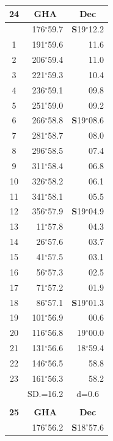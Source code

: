 \documentclass[10pt, a4paper]{report}
\begin{document}
\begin{scriptsize}
\begin{tabular*}{0.2\textwidth}[t]{@{\extracolsep{\fill}}|c|rr|}
\hline
\multicolumn{1}{|c|}{\rule{0pt}{2.6ex}\textbf{24}} & \multicolumn{1}{c}{\textbf{GHA}} & \multicolumn{1}{c|}{\textbf{Dec}}\\
\hline\rule{0pt}{2.6ex}\noindent
0 & 176$^\circ$59.7 & \textbf{S}19$^\circ$12.2\\
1 & 191$^\circ$59.6 & 11.6\\
2 & 206$^\circ$59.4 & 11.0\\
3 & 221$^\circ$59.3 & \raisebox{0.24ex}{\boldmath$\cdot$~\boldmath$\cdot$~~}10.4\\
4 & 236$^\circ$59.1 & 09.8\\
5 & 251$^\circ$59.0 & 09.2\\[2Pt]
6 & 266$^\circ$58.8 & \textbf{S}19$^\circ$08.6\\
7 & 281$^\circ$58.7 & 08.0\\
8 & 296$^\circ$58.5 & 07.4\\
9 & 311$^\circ$58.4 & \raisebox{0.24ex}{\boldmath$\cdot$~\boldmath$\cdot$~~}06.8\\
10 & 326$^\circ$58.2 & 06.1\\
11 & 341$^\circ$58.1 & 05.5\\[2Pt]
12 & 356$^\circ$57.9 & \textbf{S}19$^\circ$04.9\\
13 & 11$^\circ$57.8 & 04.3\\
14 & 26$^\circ$57.6 & 03.7\\
15 & 41$^\circ$57.5 & \raisebox{0.24ex}{\boldmath$\cdot$~\boldmath$\cdot$~~}03.1\\
16 & 56$^\circ$57.3 & 02.5\\
17 & 71$^\circ$57.2 & 01.9\\[2Pt]
18 & 86$^\circ$57.1 & \textbf{S}19$^\circ$01.3\\
19 & 101$^\circ$56.9 & 00.6\\
20 & 116$^\circ$56.8 & 19$^\circ$00.0\\
21 & 131$^\circ$56.6 & 18$^\circ$59.4\\
22 & 146$^\circ$56.5 & 58.8\\
23 & 161$^\circ$56.3 & 58.2\\
\hline
\rule{0pt}{2.4ex} & \multicolumn{1}{c}{SD.=16.2} & \multicolumn{1}{c|}{d=0.6}\\
\hline
\multicolumn{1}{c}{}\\[-0.5ex]\hline
\multicolumn{1}{|c|}{\rule{0pt}{2.6ex}\textbf{25}} & \multicolumn{1}{c}{\textbf{GHA}} & \multicolumn{1}{c|}{\textbf{Dec}}\\
\hline\rule{0pt}{2.6ex}\noindent
0 & 176$^\circ$56.2 & \textbf{S}18$^\circ$57.6\\

\end{tabular*}
\end{scriptsize}
\end{document}
